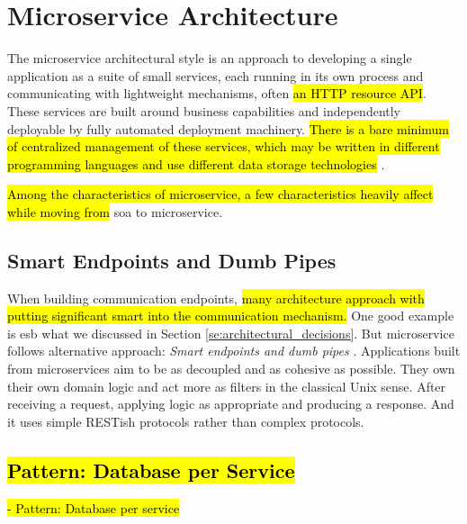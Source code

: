 \section{Microservice Architecture}

The microservice architectural style is an approach to developing a single application as a suite of small services, each running in its own process and communicating with lightweight mechanisms, often \hl{an HTTP resource API}. These services are built around business capabilities and independently deployable by fully automated deployment machinery. \hl{There is a bare minimum of centralized management of these services, which may be written in different programming languages and use different data storage technologies} \cite{LewisMicroservices}.

\hl{Among the characteristics of microservice, a few characteristics heavily affect while moving from} \acrshort{soa} to microservice.

\subsection{Smart Endpoints and Dumb Pipes}
\label{subse:dumb_pipes}

When building communication endpoints, \hl{many architecture approach with putting significant smart into the communication mechanism.} One good example is \acrshort{esb} what we discussed in Section \ref{se:architectural_decisions}. But microservice follows alternative approach: \emph{Smart endpoints and dumb pipes} \cite{LewisMicroservicesPipes}.
Applications built from microservices aim to be as decoupled and as cohesive as possible. They own their own domain logic and act more as filters in the classical Unix sense. After receiving a request, applying logic as appropriate and producing a response. And it uses simple RESTish protocols rather than complex protocols.

\subsection{\hl{Pattern: Database per Service}}
\label{subse:database_per_service}
\hl{- Pattern: Database per service} 


